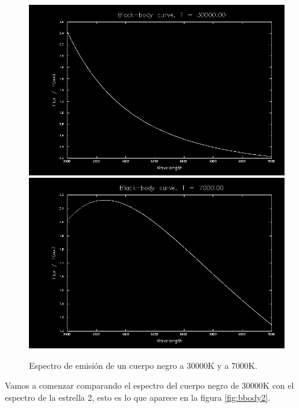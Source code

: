 \documentclass{aa} %
\begin{document}
\begin{figure}[h!]
\begin{center}
\includegraphics[scale=0.15]{bbody 30000.png}
\includegraphics[scale=0.15]{bbody 7000.png}
\caption{Espectro de emisión de un cuerpo negro a 30000K y a 7000K.}
\label{fig:bbody}
\end{center}
\end{figure}

Vamos a comenzar comparando el espectro del cuerpo negro de 30000K con el espectro de la estrella 2, esto es lo que aparece en la figura \ref{fig:bbody2}.
\end{document}
